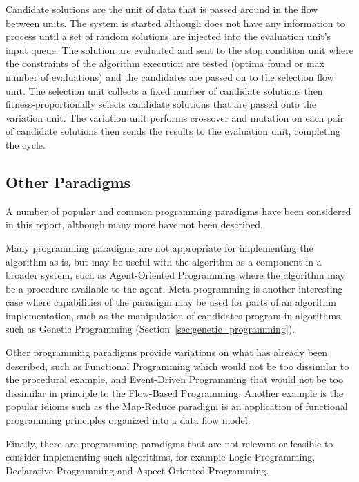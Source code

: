 Candidate solutions are the unit of data that is passed around in the flow between units.
The system is started although does not have any information to process until a set of random solutions are injected into the evaluation unit's input queue. The solution are evaluated and sent to the stop condition unit where the constraints of the algorithm execution are tested (optima found or max number of evaluations) and the candidates are passed on to the selection flow unit. The selection unit collects a fixed number of candidate solutions then fitness-proportionally selects candidate solutions that are passed onto the variation unit. The variation unit performs crossover and mutation on each pair of candidate solutions then sends the results to the evaluation unit, completing the cycle.



% 
% 
\subsection{Other Paradigms}
\label{sec:other}
A number of popular and common programming paradigms have been considered in this report, although many more have not been described. 

Many programming paradigms are not appropriate for implementing the algorithm as-is, but may be useful with the algorithm as a component in a broader system, such as Agent-Oriented Programming where the algorithm may be a procedure available to the agent. Meta-programming is another interesting case where capabilities of the paradigm may be used for parts of an algorithm implementation, such as the manipulation of candidates program in algorithms such as Genetic Programming (Section~\ref{sec:genetic_programming}).

Other programming paradigms provide variations on what has already been described, such as Functional Programming which would not be too dissimilar to the procedural example, and Event-Driven Programming that would not be too dissimilar in principle to the Flow-Based Programming. Another example is the popular idioms such as the Map-Reduce paradigm is an application of functional programming principles organized into a data flow model.

Finally, there are programming paradigms that are not relevant or feasible to consider implementing such algorithms, for example Logic Programming, Declarative Programming and Aspect-Oriented Programming.

